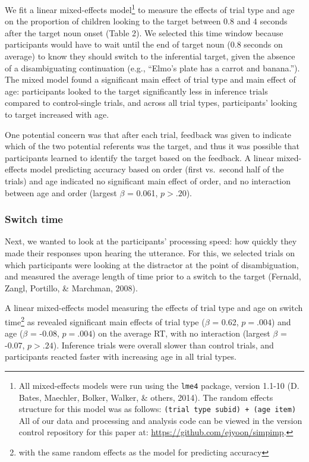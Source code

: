 \documentclass[a4paper,man,apacite,floatsintext]{apa6}
\begin{document}
We fit a linear mixed-effects model\footnote{All mixed-effects models
  were run using the \texttt{lme4} package, version 1.1-10 (D. Bates,
  Maechler, Bolker, Walker, \& others, 2014). The random effects
  structure for this model was as follows:
  \texttt{(trial type \textbar{} subid) + (age \textbar{} item)} All of
  our data and processing and analysis code can be viewed in the version
  control repository for this paper at:
  \url{https://github.com/ejyoon/simpimp}.} to measure the effects of
trial type and age on the proportion of children looking to the target
between 0.8 and 4 seconds after the target noun onset (Table 2). We
selected this time window because participants would have to wait until
the end of target noun (0.8 seconds on average) to know they should
switch to the inferential target, given the absence of a disambiguating
continuation (e.g., ``Elmo's plate has a carrot and banana.''). The
mixed model found a significant main effect of trial type and main
effect of age: participants looked to the target significantly less in
inference trials compared to control-single trials, and across all trial
types, participants' looking to target increased with age.

One potential concern was that after each trial, feedback was given to
indicate which of the two potential referents was the target, and thus
it was possible that participants learned to identify the target based
on the feedback. A linear mixed-effects model predicting accuracy based
on order (first vs.~second half of the trials) and age indicated no
significant main effect of order, and no interaction between age and
order (largest \(\beta\) = 0.061, \(p >.20\)).

\subsubsection{Switch time}\label{switch-time}

Next, we wanted to look at the participants' processing speed: how
quickly they made their responses upon hearing the utterance. For this,
we selected trials on which participants were looking at the distractor
at the point of disambiguation, and measured the average length of time
prior to a switch to the target (Fernald, Zangl, Portillo, \& Marchman,
2008).

A linear mixed-effects model measuring the effects of trial type and age
on switch time\footnote{with the same random effects as the model for
  predicting accuracy} as revealed significant main effects of trial
type (\(\beta\) = 0.62, \(p =.004\)) and age (\(\beta\) = -0.08,
\(p =.004\)) on the average RT, with no interaction (largest \(\beta\) =
-0.07, \(p >.24\)). Inference trials were overall slower than control
trials, and participants reacted faster with increasing age in all trial
types.
\end{document}
